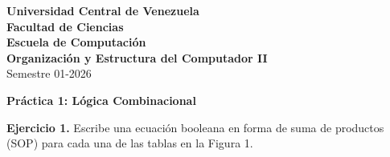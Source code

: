 \documentclass[letterpaper,12pt]{article}
\begin{document}

\noindent \textbf{Universidad Central de Venezuela}\\
\textbf{Facultad de Ciencias}\\
\textbf{Escuela de Computación}\\
\textbf{Organización y Estructura del Computador II}\\
Semestre 01-2026

\vspace{0.3cm}
\begin{center}
{\textbf{Práctica 1: Lógica Combinacional}}
\end{center}
\vspace{0.5cm}


\noindent\textbf{{Ejercicio 1.}} Escribe una ecuación booleana en forma de suma de productos (SOP) para cada una de las tablas en la Figura 1.
\end{document}
